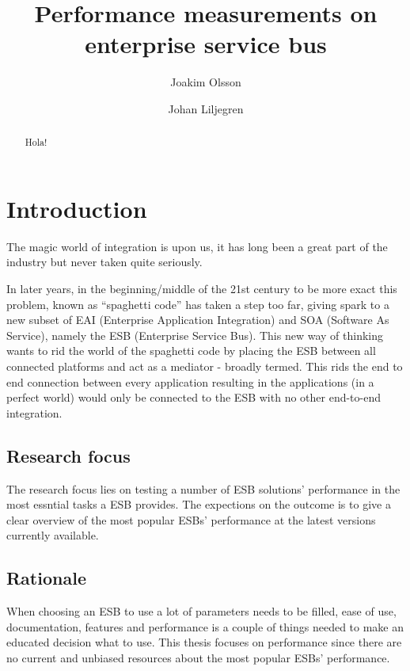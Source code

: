 \documentclass{llncs}
\title{Performance measurements on enterprise service bus}
\author{Joakim Olsson \inst{1} \and Johan Liljegren\inst{1}}
\institute{
	Blekinge Institute of Technology \\
	\email{laggmonkei@gmail.com}, \email{datanizze@gmail.com}
}
\begin{document}
\maketitle
\begin{abstract}
Hola!
\end{abstract}

\section{Introduction} %
The magic world of integration is upon us, it has long been a great part of the industry but never taken quite seriously.

In later years, in the beginning/middle of the 21st century to be more exact this problem, known as ``spaghetti code'' has taken a step too far, giving spark to a new subset of EAI (Enterprise Application Integration) and SOA  (Software As Service), namely the ESB (Enterprise Service Bus).
This new way of thinking wants to rid the world of the spaghetti code by placing the ESB between all connected platforms and act as a mediator - broadly termed. 
This rids the end to end connection between every application resulting in the applications (in a perfect world) would only be connected to the ESB with no other end-to-end integration.

\subsection{Research focus}
The research focus lies on testing a number of ESB solutions' performance in the most essntial tasks a ESB provides. The expections on the outcome is to give a clear overview of the most popular ESBs' performance at the latest versions currently available.

\subsection{Rationale}
When choosing an ESB to use a lot of parameters needs to be filled, ease of use, documentation, features and performance is a couple of things needed to make an educated decision what to use. This thesis focuses on performance since there are no current and unbiased resources about the most popular ESBs' performance.
\end{document}
